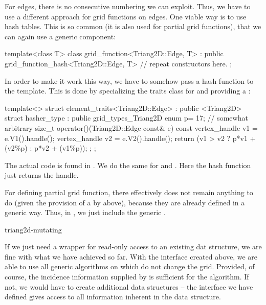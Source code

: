 For edges, there is no consecutive numbering we can exploit.
Thus, we have to use a different approach for grid functions
on edges. One viable way is to use hash tables. 
This is so common (it is also used for partial grid functions),
that we can again use a generic component:
\begin{example}
template<class T>
class grid_function<Triang2D::Edge, T> 
  : public grid_function_hash<Triang2D::Edge, T> 
{
  // repeat constructors here.
};
\end{example}
In order to make it work this way, we have to somehow
pass a hash function to the 
template. This is done by specializing the traits class
 for 
and providing a :
\begin{example}
template<>
struct element_traits<Triang2D::Edge> 
  : public <Triang2D> 
{
  struct hasher_type : public grid_types_Triang2D {
    enum { p= 17}; // somewhat arbitrary
    size_t operator()(Triang2D::Edge const& e) const { 
      vertex_handle v1 = e.V1().handle();
      vertex_handle v2 = e.V2().handle();
      return (v1 > v2 ? p*v1 + (v2\%p) : p*v2 + (v1\%p));
    }
  };
};
\end{example}
The actual code is found in 
.
We do the same for  and .
Here the hash function just returns the handle.

For defining partial grid function, there effectively does not remain
anything to do (given the provision of a  by
 above), because they are already defined in a generic
way. Thus, in ,
we just include the generic .

\begin{Label}{triang2d-mutating}
\end{Label}

If we just need a wrapper for read-only access to an existing
dat structure, we are fine with what we have achieved so far.
With the interface created above, we are able to use all generic
algorithms on  which do not change the grid.
Provided, of course, the incidence information supplied by 
 is sufficient for the algorithm.
If not, we would have to create additional data structures
-- the interface we have defined gives access to all information
inherent in the data structure.

